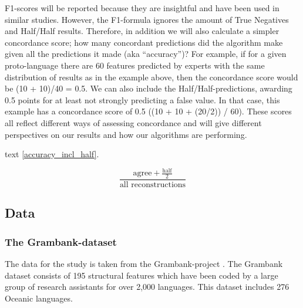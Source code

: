 \documentclass[draft,10pt]{article} %
\begin{document}
F1-scores will be reported because they are insightful and have been used in similar studies. However, the F1-formula ignores the amount of True Negatives and Half/Half results. Therefore, in addition we will also calculate a simpler concordance score; how many concordant predictions did the algorithm make given all the predictions it made (aka ``accuracy'')? For example, if for a given proto-language there are 60 features predicted by experts with the same distribution of results as in the example above, then the concordance score would be (10 + 10)/40 = 0.5. We can also include the Half/Half-predictions, awarding 0.5 points for at least not strongly predicting a false value. In that case, this example has a concordance score of 0.5 ((10 + 10 + (20/2)) / 60). These scores all reflect different ways of assessing concordance and will give different perspectives on our results and how our algorithms are performing. %


text \eqref{accuracy_incl_half}.

\begin{equation} \label{accuracy_incl_half}
\frac{\text{agree} + \frac{\text{half}}{2}}{\text{all reconstructions}}
\end{equation}

\subsection{Data}

\subsubsection{The Grambank-dataset}
\label{asr:sec:GBcoverage}

The data for the study is taken from the Grambank-project \citep{grambankwebsite}. The Grambank dataset consists of 195 structural features which have been coded by a large group of research assistants for over 2,000 languages. This dataset includes 276 Oceanic languages. 

\end{document}
